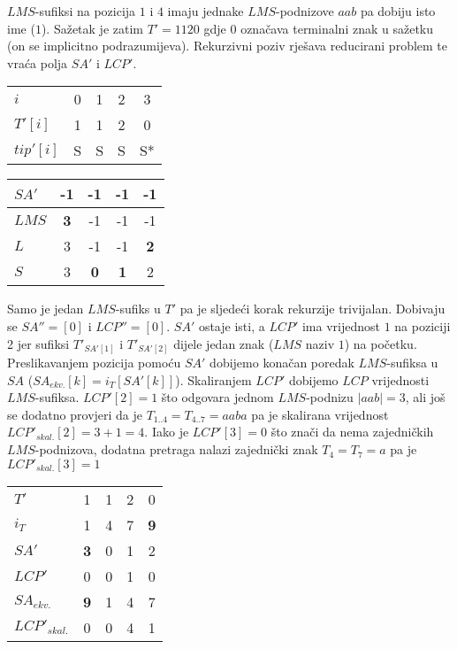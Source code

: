 \documentclass[times, utf8, proizvoljni, numeric]{fer}
\begin{document}
$LMS$-sufiksi na pozicija $1$ i $4$ imaju jednake $LMS$-podnizove $aab$ pa dobiju isto ime ($1$). Sažetak je zatim $T'=1120$ gdje $0$ označava terminalni znak u sažetku (on se implicitno podrazumijeva). Rekurzivni poziv rješava reducirani problem te vraća polja $SA'$ i $LCP'$.

\begin{center}
	\begin{tabular}{l | c c c c |}
		$i$ & 0 & 1 & 2 & 3 \\
		$T'[i]$ & 1 & 1 & 2 & 0 \\
		$tip'[i]$ & S & S & S & S* \\
	\end{tabular}
\end{center}

\begin{center}
	\begin{tabular}{l | c | c c | c |}
		$SA'$ & -1 & -1 & -1 & -1 \\ \hline
		$LMS$ & \textbf{3} & -1 & -1 & -1 \\
		$L$ & 3 & -1 & -1 & \textbf{2} \\
		$S$ & 3 & \textbf{0} & \textbf{1} & 2 \\ \hline
	\end{tabular}
\end{center}

Samo je jedan $LMS$-sufiks u $T'$ pa je sljedeći korak rekurzije trivijalan. Dobivaju se $SA''=[0]$ i $LCP''=[0]$. $SA'$ ostaje isti, a $LCP'$ ima vrijednost $1$ na poziciji 2 jer sufiksi $T'_{SA'[1]}$ i $T'_{SA'[2]}$ dijele jedan znak ($LMS$ naziv $1$) na početku. Preslikavanjem pozicija pomoću $SA'$ dobijemo konačan poredak $LMS$-sufiksa u $SA$ ($SA_{ekv.}[k]=i_{T}[SA'[k]]$). Skaliranjem $LCP'$ dobijemo $LCP$ vrijednosti $LMS$-sufiksa. $LCP'[2]=1$ što odgovara jednom $LMS$-podnizu $|aab|=3$, ali još se dodatno provjeri da je $T_{1..4}=T_{4..7}=aaba$ pa je skalirana vrijednost $LCP'_{skal.}[2]=3+1=4$. Iako je $LCP'[3]=0$ što znači da nema zajedničkih $LMS$-podnizova, dodatna pretraga nalazi zajednički znak $T_{4}=T_{7}=a$ pa je $LCP'_{skal.}[3]=1$

\begin{center}
	\begin{tabular}{l | c c c c |}
		$T'$ & 1 & 1 & 2 & 0 \\
		$i_{T}$ & 1 & 4 & 7 & \textbf{9} \\ \hline
		$SA'$ & \textbf{3} & 0 & 1 & 2 \\
		$LCP'$ & 0 & 0 & 1 & 0 \\ \hline
		$SA_{ekv.}$ & \textbf{9} & 1 & 4 & 7 \\
		$LCP'_{skal.}$ & 0 & 0 & 4 & 1 \\
	\end{tabular}
\end{center}
\end{document}
